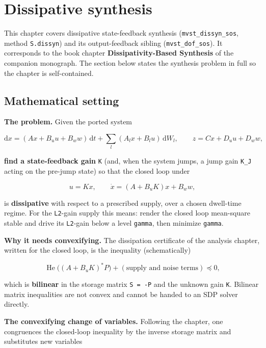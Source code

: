 \documentclass[11pt,oneside]{report}
\newcommand{\code}[1]{\texttt{#1}}
\begin{document}
\hypertarget{chap:09-dissipative-synthesis}{%
\chapter{Dissipative synthesis}\label{chap:09-dissipative-synthesis}}

This chapter covers dissipative state-feedback synthesis (\code{mvst\_dissyn\_sos},
method \code{S.dissyn}) and its output-feedback sibling (\code{mvst\_dof\_sos}). It
corresponds to the book chapter \textbf{Dissipativity-Based Synthesis} of the
companion monograph. The section below states the synthesis problem in full so
the chapter is self-contained.

\hypertarget{mathematical-setting}{%
\section{Mathematical setting}\label{mathematical-setting}}

\textbf{The problem.} Given the ported system

\[
\mathrm{d}x = (A x + B_u u + B_w w)\,\mathrm{d}t
   + \sum_l (A_l x + B_l u)\,\mathrm{d}W_l ,
\qquad z = C x + D_u u + D_w w ,
\]

\textbf{find a state-feedback gain} \code{K} (and, when the system jumps, a jump gain
\code{K\_J} acting on the pre-jump state) so that the closed loop under

\[
u = K x ,
\qquad
\dot x = (A + B_u K) x + B_w w ,
\]

is \textbf{dissipative} with respect to a prescribed supply, over a chosen dwell-time
regime. For the \code{L2}-gain supply this means: render the closed loop mean-square
stable and drive its \code{L2}-gain below a level \code{gamma}, then minimize \code{gamma}.

\textbf{Why it needs convexifying.} The dissipation certificate of the analysis
chapter, written for the closed loop, is the inequality (schematically)

\[
\operatorname{He}\big((A + B_u K)^{*} P\big) + (\text{supply and noise terms}) \preceq 0 ,
\]

which is \textbf{bilinear} in the storage matrix \code{S = -P} and the unknown gain \code{K}.
Bilinear matrix inequalities are not convex and cannot be handed to an SDP
solver directly.

\textbf{The convexifying change of variables.} Following the chapter, one congruences
the closed-loop inequality by the inverse storage matrix and substitutes new
variables
\end{document}
